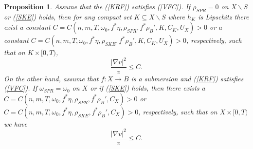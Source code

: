 \documentclass[12pt]{article}
\newtheorem{proposition}[theorem]{Proposition}
\numberwithin{equation}{section}
\begin{document}
\begin{proposition}
Assume that the (\ref{KRF}) satisfies (\ref{VFC}). If $\rho_{SPR} = 0$ on $X \backslash S$ or (\ref{SKE}) holds, then for any compact set $K \subseteq X \backslash S$ where $h_K$ is Lipschitz there exist a constant $C = C(n,m,T,\omega_0,f^*\eta,\rho_{SPR},f^*\rho_B',K,C_K,U_X) > 0$ or a constant $C = C(n,m,T,\omega_0,f^*\eta,\rho_{SKE},f^*\rho_B',K,C_K,U_X) > 0$, respectively, such that on $K \times [0,T)$,
\begin{equation*}
    \frac{|\nabla v|^2}{v} \leq C.
\end{equation*}
On the other hand, assume that $f:X \to B$ is a submersion and (\ref{KRF}) satisfies (\ref{VFC}). If $\omega_{SPR} = \omega_{0}$ on $X$ or if (\ref{SKE}) holds, then there exists a $C = C(n,m,T,\omega_0, f^*\eta,\rho_{SPR},f^*\rho_B',C_X) > 0$ or $C = C(n,m,T,\omega_0,f^*\eta,\rho_{SKE},f^*\rho_B',C_X) > 0$, respectively, such that on $X \times [0,T)$ we have
\begin{equation*}
    \frac{|\nabla v|^2}{v} \leq C.
\end{equation*}
\end{proposition}
\end{document}
